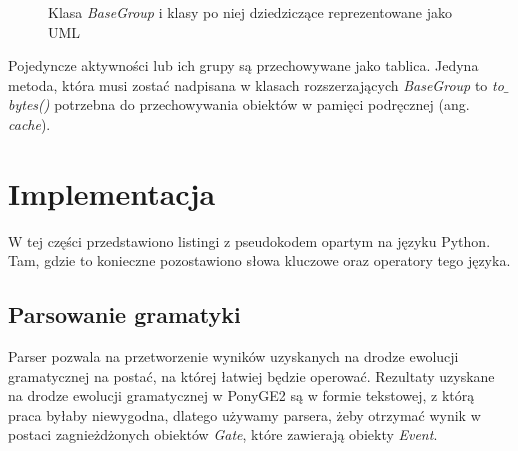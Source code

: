 \begin{figure}[H]
	\caption{\label{fig:EventUML}Klasa \textit{BaseGroup} i klasy po niej dziedziczące reprezentowane jako UML}
\end{figure}

Pojedyncze aktywności lub ich grupy są przechowywane jako tablica. Jedyna metoda, która musi zostać nadpisana w klasach rozszerzających \textit{BaseGroup} to \textit{to$\_$bytes()} potrzebna do przechowywania obiektów w pamięci podręcznej (ang. \textit{cache}). 

\section{Implementacja}

W tej części przedstawiono listingi z pseudokodem opartym na języku Python. Tam, gdzie to konieczne pozostawiono słowa kluczowe oraz operatory tego języka.

\subsection{Parsowanie gramatyki}
Parser pozwala na przetworzenie wyników uzyskanych na drodze ewolucji gramatycznej na postać, na której łatwiej będzie operować. Rezultaty uzyskane na drodze ewolucji gramatycznej w PonyGE2 są w formie tekstowej, z którą praca byłaby niewygodna, dlatego używamy parsera, żeby otrzymać wynik w postaci zagnieżdżonych obiektów \textit{Gate}, które zawierają obiekty \textit{Event}.

